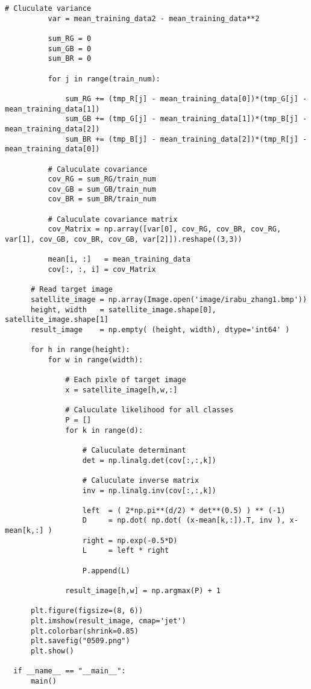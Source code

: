 \documentclass{jarticle}
\begin{document}
\begin{lstlisting}[basicstyle=\ttfamily\footnotesize, frame=single]
          # Cluculate variance
          var = mean_training_data2 - mean_training_data**2
  
          sum_RG = 0
          sum_GB = 0
          sum_BR = 0
  
          for j in range(train_num):
  
              sum_RG += (tmp_R[j] - mean_training_data[0])*(tmp_G[j] - mean_training_data[1])
              sum_GB += (tmp_G[j] - mean_training_data[1])*(tmp_B[j] - mean_training_data[2])
              sum_BR += (tmp_B[j] - mean_training_data[2])*(tmp_R[j] - mean_training_data[0])
  
          # Caluculate covariance
          cov_RG = sum_RG/train_num
          cov_GB = sum_GB/train_num
          cov_BR = sum_BR/train_num
  
          # Caluculate covariance matrix
          cov_Matrix = np.array([var[0], cov_RG, cov_BR, cov_RG, var[1], cov_GB, cov_BR, cov_GB, var[2]]).reshape((3,3))
  
          mean[i, :]   = mean_training_data
          cov[:, :, i] = cov_Matrix
  
      # Read target image
      satellite_image = np.array(Image.open('image/irabu_zhang1.bmp'))
      height, width   = satellite_image.shape[0], satellite_image.shape[1]
      result_image    = np.empty( (height, width), dtype='int64' )
  
      for h in range(height):
          for w in range(width):
  
              # Each pixle of target image
              x = satellite_image[h,w,:]
  
              # Caluculate likelihood for all classes
              P = []
              for k in range(d):
  
                  # Caluculate determinant
                  det = np.linalg.det(cov[:,:,k])
  
                  # Caluculate inverse matrix
                  inv = np.linalg.inv(cov[:,:,k])
  
                  left  = ( 2*np.pi**(d/2) * det**(0.5) ) ** (-1)
                  D     = np.dot( np.dot( (x-mean[k,:]).T, inv ), x-mean[k,:] )
                  right = np.exp(-0.5*D)
                  L     = left * right
  
                  P.append(L)
  
              result_image[h,w] = np.argmax(P) + 1
  
      plt.figure(figsize=(8, 6))
      plt.imshow(result_image, cmap='jet')
      plt.colorbar(shrink=0.85)
      plt.savefig("0509.png")
      plt.show()
  
  if __name__ == "__main__":
      main()
\end{lstlisting}
\end{document}
